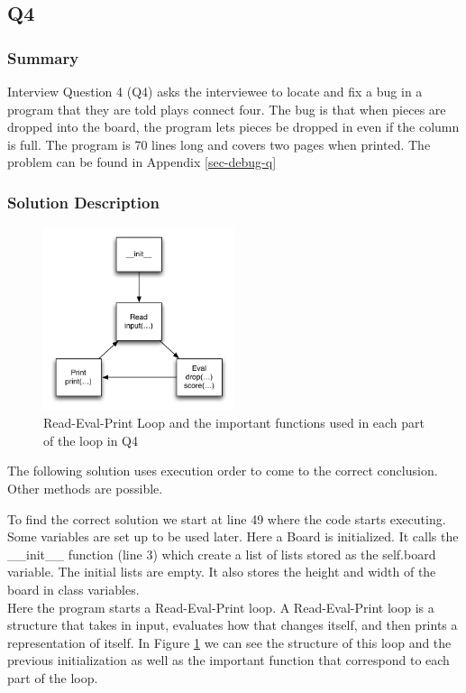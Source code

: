 \newpage
\subsection{Q4}
\subsubsection{Summary}
Interview Question 4 (Q4) asks the interviewee to locate and fix a bug in a program that they are told plays connect four.
The bug is that when pieces are dropped into the board, the program lets pieces be dropped in even if the column is full.
The program is 70 lines long and covers two pages when printed.
The problem can be found in Appendix \ref{sec-debug-q}

\subsubsection{Solution Description}
\begin{figure}[t]
\centering
\includegraphics[width=0.5\textwidth]{Q4diagram.pdf}
\caption{Read-Eval-Print Loop and the important functions used in each part of the loop in Q4}
\label{fig-q2}
\end{figure}

The following solution uses execution order to come to the correct conclusion. Other methods are possible. 

To find the correct solution we start at line 49 where the code starts executing.
Some variables are set up to be used later. 
Here a Board is initialized.
It calls the \_\_init\_\_ function (line 3) which create a list of lists stored as the self.board variable.
The initial lists are empty.
It also stores the height and width of the board in class variables. \\

Here the program starts a Read-Eval-Print loop. A Read-Eval-Print loop is a structure that takes in input, evaluates how that changes itself, and then prints a representation of itself. In Figure \ref{fig-q2} we can see the structure of this loop and the previous initialization as well as the important function that correspond to each part of the loop.\\

